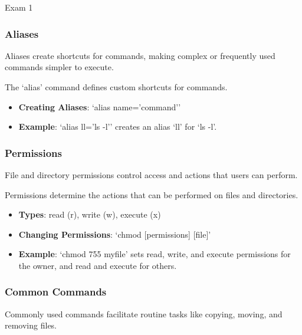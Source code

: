 \begin{examnotes}{Exam 1}
    \subsubsection*{Aliases}
    
    Aliases create shortcuts for commands, making complex or frequently used commands simpler to execute.
    
    \begin{highlight}[Aliases]
        The `alias' command defines custom shortcuts for commands.
        
        \begin{itemize}
            \item \textbf{Creating Aliases}: `alias name='command''
            \item \textbf{Example}: `alias ll='ls -l'' creates an alias `ll' for `ls -l'.
        \end{itemize}
    \end{highlight}
    
    \subsubsection*{Permissions}
    
    File and directory permissions control access and actions that users can perform.
    
    \begin{highlight}[Permissions]
        Permissions determine the actions that can be performed on files and directories.
        
        \begin{itemize}
            \item \textbf{Types}: read (r), write (w), execute (x)
            \item \textbf{Changing Permissions}: `chmod [permissions] [file]'
            \item \textbf{Example}: `chmod 755 myfile' sets read, write, and execute permissions for the owner, and read and execute for others.
        \end{itemize}
    \end{highlight}
    
    \subsubsection*{Common Commands}
    
    Commonly used commands facilitate routine tasks like copying, moving, and removing files.
    

\end{examnotes}
